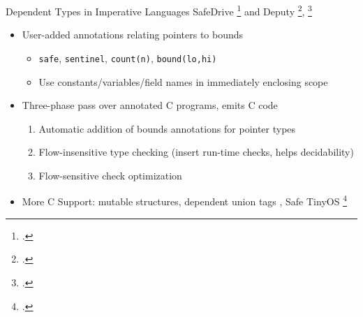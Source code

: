 \documentclass[aspectratio=169]{beamer}
\begin{document}
\begin{frame}{Dependent Types in Imperative Languages}
SafeDrive \footcite{zhou_safedrive:_2006} and Deputy \footcite{condit_dependent_2007}, \footcite{anderson_static_2007}
    \begin{itemize}[<+->]
        \item User-added annotations relating pointers to bounds
            \begin{itemize}
                \item \texttt{safe}, \texttt{sentinel}, \texttt{count(n)}, \texttt{bound(lo,hi)}
                \item Use constants/variables/field names in immediately enclosing scope 
            \end{itemize}
        \item Three-phase pass over annotated C programs, emits C code
            \begin{enumerate}
                \item Automatic addition of bounds annotations for pointer types 
                \item Flow-insensitive type checking (insert run-time checks, helps decidability) 
                \item Flow-sensitive check optimization
            \end{enumerate}
        \item More C Support: mutable structures, dependent union tags , Safe TinyOS \footcite{cooprider_efficient_2007} %
    \end{itemize}
    \vspace{0.2in}
\end{frame}
\end{document}
